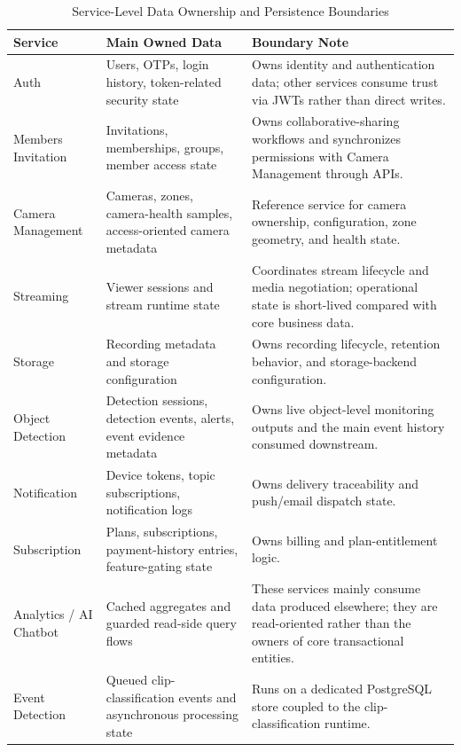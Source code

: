 \documentclass[12pt,a4paper,oneside]{report}
\begin{document}
\begin{table}[!htbp]
\centering
\small
\begin{tabularx}{\textwidth}{|p{}|p{}|X|}
\hline
\textbf{Service} & \textbf{Main Owned Data} & \textbf{Boundary Note} \\
\hline
Auth & Users, OTPs, login history, token-related security state & Owns identity and authentication data; other services consume trust via JWTs rather than direct writes. \\ \hline
Members Invitation & Invitations, memberships, groups, member access state & Owns collaborative-sharing workflows and synchronizes permissions with Camera Management through APIs. \\ \hline
Camera Management & Cameras, zones, camera-health samples, access-oriented camera metadata & Reference service for camera ownership, configuration, zone geometry, and health state. \\ \hline
Streaming & Viewer sessions and stream runtime state & Coordinates stream lifecycle and media negotiation; operational state is short-lived compared with core business data. \\ \hline
Storage & Recording metadata and storage configuration & Owns recording lifecycle, retention behavior, and storage-backend configuration. \\ \hline
Object Detection & Detection sessions, detection events, alerts, event evidence metadata & Owns live object-level monitoring outputs and the main event history consumed downstream. \\ \hline
Notification & Device tokens, topic subscriptions, notification logs & Owns delivery traceability and push/email dispatch state. \\ \hline
Subscription & Plans, subscriptions, payment-history entries, feature-gating state & Owns billing and plan-entitlement logic. \\ \hline
Analytics / AI Chatbot & Cached aggregates and guarded read-side query flows & These services mainly consume data produced elsewhere; they are read-oriented rather than the owners of core transactional entities. \\ \hline
Event Detection & Queued clip-classification events and asynchronous processing state & Runs on a dedicated PostgreSQL store coupled to the clip-classification runtime. \\ \hline
\end{tabularx}
\caption{Service-Level Data Ownership and Persistence Boundaries}
\label{tab:service_data_boundaries}
\end{table}
\end{document}
